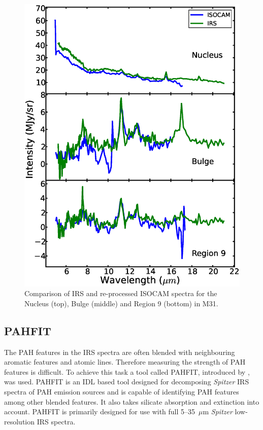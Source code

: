 \begin{figure}
\centering
\includegraphics[scale=0.35]{./ISOvsIRS.eps}
\caption{ Comparison of  IRS and re-processed ISOCAM spectra for the Nucleus (top), Bulge (middle) and Region 9 (bottom) in M31.}
\label{ISOnIRS}
\end{figure}


\subsection{PAHFIT}

The PAH features in the IRS spectra are often blended with neighbouring aromatic features and atomic lines. Therefore measuring the strength of PAH features is difficult. To achieve this task a tool called PAHFIT, introduced by \citet{Smith:2007lr}, was used. PAHFIT is an IDL  based tool designed for decomposing {\em Spitzer} IRS spectra of PAH emission sources and is capable of identifying PAH features among other blended features. It also takes silicate absorption and extinction into account. PAHFIT is primarily designed for use with full 5--35~$\mu$m {\em Spitzer} low-resolution IRS spectra.
%

